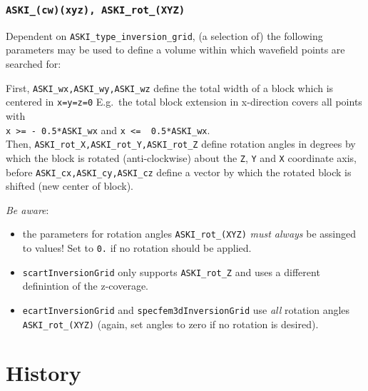 \documentclass[12pt,a4paper]{article}
\newcommand{\lcode}[1]{\nolinkurl{#1}}
\begin{document}
\subsubsection*{\lcode{ASKI_(cw)(xyz), ASKI_rot_(XYZ)}}
Dependent on \lcode{ASKI_type_inversion_grid}, (a selection of) the following parameters may be used to define a volume 
within which wavefield points are searched for:

First, \lcode{ASKI_wx,ASKI_wy,ASKI_wz} define the total width of a block which is centered in \lcode{x=y=z=0}
E.g.\ the total block extension in x-direction covers all points with\\
\lcode{x >= - 0.5*ASKI_wx} and \lcode{x <=  0.5*ASKI_wx}.\\
Then, \lcode{ASKI_rot_X,ASKI_rot_Y,ASKI_rot_Z} define rotation angles in degrees by which the block is 
rotated (anti-clockwise) about the \lcode{Z}, \lcode{Y} and \lcode{X} coordinate axis, before 
\lcode{ASKI_cx,ASKI_cy,ASKI_cz} define a vector by which the rotated block is shifted (new center of block).

\emph{Be aware}:
\begin{itemize}
\item the parameters for rotation angles \lcode{ASKI_rot_(XYZ)} \emph{must always} be assinged to values! 
  Set to \lcode{0.} if no rotation should be applied.
\item \lcode{scartInversionGrid} only supports \lcode{ASKI_rot_Z} and uses a different definintion of the z-coverage.
\item \lcode{ecartInversionGrid} and \lcode{specfem3dInversionGrid} use \emph{all} rotation angles \lcode{ASKI_rot_(XYZ)} 
(again, set angles to zero if no rotation is desired).
\end{itemize}
%


%
\newpage
\section*{History}

%
\newpage

%
\end{document}
